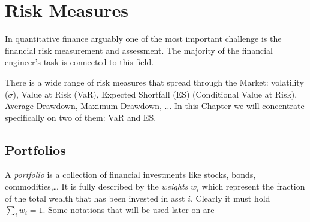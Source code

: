 \chapter{Risk Measures}
\label{var-and-credit-risk}

In quantitative finance arguably one of the most important challenge is the financial risk measurement and assessment.
The majority of the financial engineer’s task is connected to this field.

There is a wide range of risk measures that spread through the Market: volatility ($\sigma$), Value at Risk (VaR), Expected Shortfall (ES) (Conditional Value at Risk), Average Drawdown, Maximum Drawdown, $\ldots$
In this Chapter we will concentrate specifically on two of them: VaR and ES.

\section{Portfolios}

A \emph{portfolio} is a collection of financial investments like stocks, bonds, commodities,\ldots
It is fully described by the \emph{weights} $w_i$ which represent the fraction of the total wealth that has been invested in asst $i$. Clearly it must hold $\sum_i w_i = 1$. 
Some notations that will be used later on are

